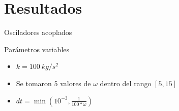 \section{Resultados}\label{sec:resultados}

\begin{frame}{Osciladores acoplados}
    \begin{minipage}{0.45\textwidth}
        \begin{block}{Parámetros variables}
            \begin{itemize}
                \item $k = 100\ kg/s^2$
                \item Se tomaron 5 valores de $\omega$ dentro del rango $[5, 15]$
                \item $dt = \min\left(10^{-3}, \frac{1}{100*\omega}\right)$
            \end{itemize}
        \end{block}
    \end{minipage}
    \hfill
    \begin{minipage}{0.45\textwidth}
    \end{minipage}
\end{frame}

